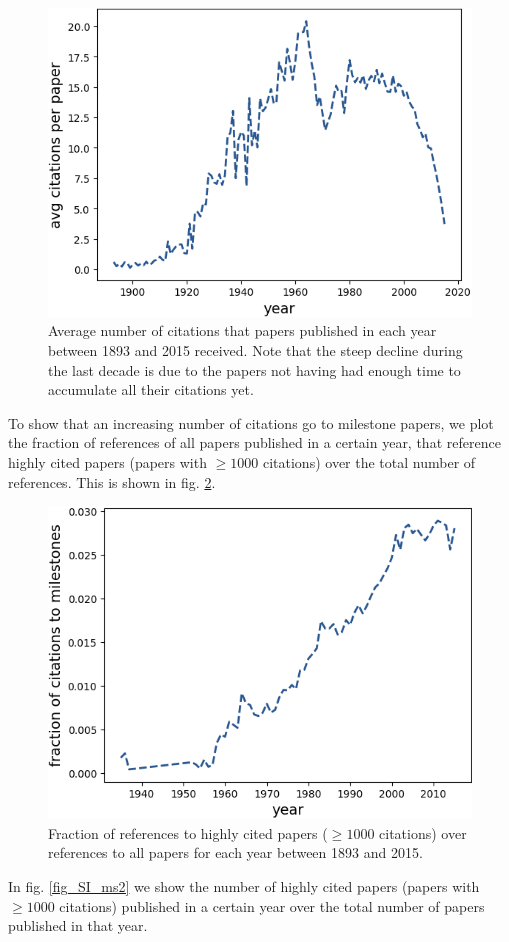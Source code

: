 \documentclass[draft,final]{vutinfth} %
\begin{document}
\begin{figure}[!ht]
	\centering
	 \includegraphics[width=0.7\columnwidth]{figures_aps/8.png}
	\caption{
	Average number of citations that papers published in each year between 1893 and 2015 received. Note that the steep decline during the last decade is due to the papers not having had enough time to accumulate all their citations yet.
	}
	\label{fig_SI_cit}
\end{figure}

To show that an increasing number of citations go to milestone papers, we plot the fraction of references of all papers published in a certain year, that reference highly cited papers (papers with $\geq 1000$ citations) over the total number of references. This is shown in fig. \ref{fig_SI_ms1}.  

\begin{figure}[!ht]
	\centering
	 \includegraphics[width=0.7\columnwidth]{figures_aps/9.png}
	\caption{
	    Fraction of references to highly cited papers ($\geq 1000$ citations) over references to all papers for each year between 1893 and 2015.
	}
	\label{fig_SI_ms1}
\end{figure}

In fig. \ref{fig_SI_ms2} we show the number of highly cited papers (papers with $\geq 1000$ citations) published in a certain year over the total number of papers published in that year.
\end{document}
